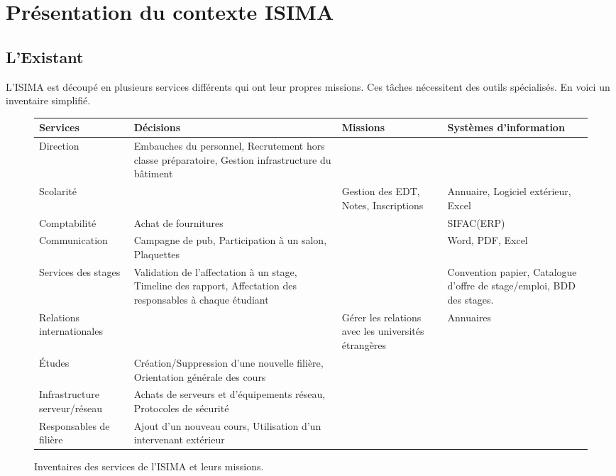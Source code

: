 \documentclass[a4paper,11pt]{report}
\begin{document}
\chapter {Présentation du contexte ISIMA}

\section{L'Existant}

\normalsize{
L'ISIMA est découpé en plusieurs services différents qui ont leur propres missions. Ces tâches nécessitent des outils spécialisés. En voici un inventaire simplifié.
}
\begin{figure}[h]
\begin{center}
\begin{tabular}{|p{3cm}|p{5cm}|p{3cm}|p{3cm}|}
\hline
Services &  Décisions & Missions & Systèmes d'information \\
\hline
Direction & Embauches du personnel, Recrutement hors classe préparatoire, Gestion infrastructure du bâtiment &  &  \\
\hline
Scolarité & & Gestion des EDT, Notes, Inscriptions  & Annuaire, Logiciel extérieur, Excel  \\
\hline
Comptabilité & Achat de fournitures &  & SIFAC(ERP)  \\
\hline
Communication &Campagne de pub, Participation à un salon, Plaquettes &  &Word, PDF, Excel  \\
\hline
Services des stages &Validation de l'affectation à un stage, Timeline des rapport, Affectation des responsables à chaque étudiant &  & Convention papier, Catalogue d'offre de stage/emploi, BDD des stages.  \\
\hline
Relations internationales &  & Gérer les relations avec les universités étrangères  & Annuaires  \\
\hline
Études & Création/Suppression d'une nouvelle filière, Orientation générale des cours &  & \\
\hline
Infrastructure serveur/réseau &Achats de serveurs et d'équipements réseau, Protocoles de sécurité &  &\\
\hline
Responsables de filière & Ajout d'un nouveau cours, Utilisation d'un intervenant extérieur &  & \\
\hline
\end{tabular}
\end{center}
\caption{Inventaires des services de l'ISIMA et leurs missions.}
\end{figure}
\end{document}
